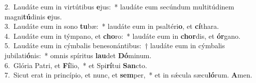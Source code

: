 {2.~}Laudáte eum in virtútibus \textbf{e}jus:~* laudáte eum secúndum multitúdinem magni\textbf{tú}dinis \textbf{e}jus.\\
{3.~}Laudáte eum in sono \textbf{tu}bæ:~* laudáte eum in psaltéri\textbf{o}, et \textbf{cí}thara.\\
{4.~}Laudáte eum in týmpano, et \textbf{cho}ro:~* laudáte eum in \textbf{chor}dis, et \textbf{ór}gano.\\
{5.~}Laudáte eum in cýmbalis benesonántibus:~† laudáte eum in cýmbalis jubilati\textbf{ó}nis:~* omnis spíritus \textbf{lau}det \textbf{Dó}minum.\\
{6.~}Glória Patri, et \textbf{Fí}lio,~* et Spi\textbf{rí}tui \textbf{San}cto.\\
{7.~}Sicut erat in princípio, et nunc, et \textbf{sem}per,~* et in sǽcula sæcu\textbf{ló}rum. \textbf{A}men.\\
